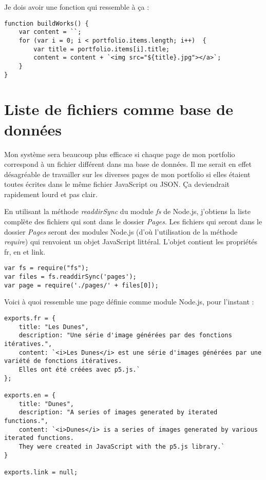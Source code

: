 Je dois avoir une fonction qui ressemble à ça :

\begin{lstlisting}
function buildWorks() {
    var content = ``;
    for (var i = 0; i < portfolio.items.length; i++)  {
        var title = portfolio.items[i].title;
        content = content + `<img src="${title}.jpg"></a>`;
    }
}
\end{lstlisting}
\clearpage
\section{Liste de fichiers comme base de données}
Mon système sera beaucoup plus efficace si chaque page de mon portfolio correspond à un fichier différent dans ma base de données. Il me serait en effet désagréable de travailler sur les diverses pages de mon portfolio si elles étaient toutes écrites dans le même fichier JavaScript ou JSON. Ça deviendrait rapidement lourd et pas clair.

En utilisant la méthode \textit{readdirSync} du module \textit{fs} de Node.js, j'obtiens la liste complète des fichiers qui sont dans le dossier \textit{Pages}. Les fichiers qui seront dans le dossier \textit{Pages} seront des modules Node.js (d'où l'utilisation de la méthode \textit{require}) qui renvoient un objet JavaScript littéral. L'objet contient les propriétés fr, en et link.

\begin{lstlisting}
var fs = require("fs");
var files = fs.readdirSync('pages');
var page = require('./pages/' + files[0]);
\end{lstlisting}

Voici à quoi ressemble une page définie comme module Node.js, pour l'instant :
\begin{lstlisting}
exports.fr = {
    title: "Les Dunes",
    description: "Une série d'image générées par des fonctions itératives.",
    content: `<i>Les Dunes</i> est une série d'images générées par une variété de fonctions itératives.
    Elles ont été créées avec p5.js.`
};

exports.en = {
    title: "Dunes",
    description: "A series of images generated by iterated functions.",
    content: `<i>Dunes</i> is a series of images generated by various iterated functions. 
    They were created in JavaScript with the p5.js library.`
}

exports.link = null;
\end{lstlisting}

